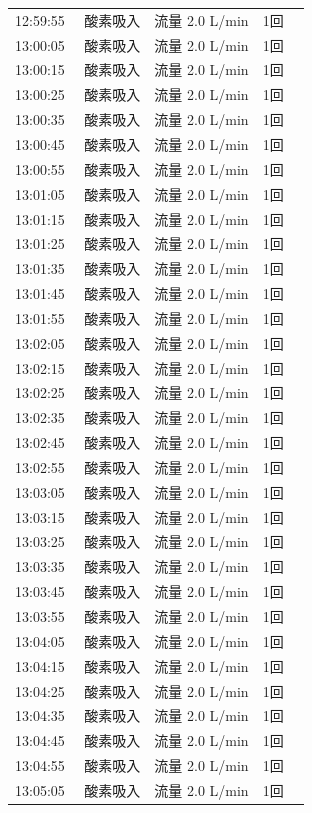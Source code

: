 \documentclass[UTF8,10pt,a4paper,fontset=fandol]{ctexart}
\begin{document}
\begin{minipage}[t]{0.48\linewidth}
\begin{tabular}{@{}p{0.22\linewidth}p{0.72\linewidth}@{}}
12:59:55 & 酸素吸入　流量 2.0 L/min　1回\\
13:00:05 & 酸素吸入　流量 2.0 L/min　1回\\
13:00:15 & 酸素吸入　流量 2.0 L/min　1回\\
13:00:25 & 酸素吸入　流量 2.0 L/min　1回\\
13:00:35 & 酸素吸入　流量 2.0 L/min　1回\\
13:00:45 & 酸素吸入　流量 2.0 L/min　1回\\
13:00:55 & 酸素吸入　流量 2.0 L/min　1回\\
13:01:05 & 酸素吸入　流量 2.0 L/min　1回\\
13:01:15 & 酸素吸入　流量 2.0 L/min　1回\\
13:01:25 & 酸素吸入　流量 2.0 L/min　1回\\
13:01:35 & 酸素吸入　流量 2.0 L/min　1回\\
13:01:45 & 酸素吸入　流量 2.0 L/min　1回\\
13:01:55 & 酸素吸入　流量 2.0 L/min　1回\\
13:02:05 & 酸素吸入　流量 2.0 L/min　1回\\
13:02:15 & 酸素吸入　流量 2.0 L/min　1回\\
13:02:25 & 酸素吸入　流量 2.0 L/min　1回\\
13:02:35 & 酸素吸入　流量 2.0 L/min　1回\\
13:02:45 & 酸素吸入　流量 2.0 L/min　1回\\
13:02:55 & 酸素吸入　流量 2.0 L/min　1回\\
13:03:05 & 酸素吸入　流量 2.0 L/min　1回\\
13:03:15 & 酸素吸入　流量 2.0 L/min　1回\\
13:03:25 & 酸素吸入　流量 2.0 L/min　1回\\
13:03:35 & 酸素吸入　流量 2.0 L/min　1回\\
13:03:45 & 酸素吸入　流量 2.0 L/min　1回\\
13:03:55 & 酸素吸入　流量 2.0 L/min　1回\\
13:04:05 & 酸素吸入　流量 2.0 L/min　1回\\
13:04:15 & 酸素吸入　流量 2.0 L/min　1回\\
13:04:25 & 酸素吸入　流量 2.0 L/min　1回\\
13:04:35 & 酸素吸入　流量 2.0 L/min　1回\\
13:04:45 & 酸素吸入　流量 2.0 L/min　1回\\
13:04:55 & 酸素吸入　流量 2.0 L/min　1回\\
13:05:05 & 酸素吸入　流量 2.0 L/min　1回\\

\end{tabular}
\end{minipage}
\end{document}
